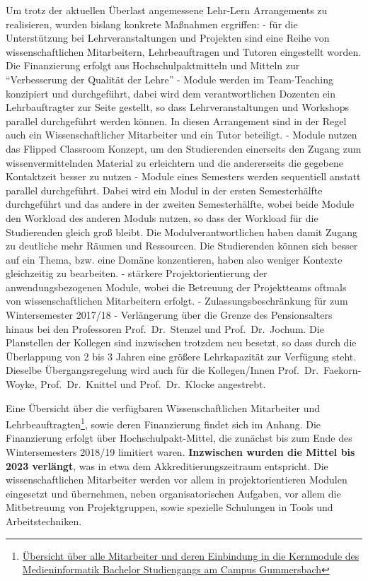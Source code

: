 Um trotz der aktuellen Überlast angemessene Lehr-Lern Arrangements zu
realisieren, wurden bislang konkrete Maßnahmen ergriffen: - für die
Unterstützung bei Lehrveranstaltungen und Projekten sind eine Reihe von
wissenschaftlichen Mitarbeitern, Lehrbeauftragen und Tutoren eingestellt
worden. Die Finanzierung erfolgt aus Hochschulpaktmitteln und Mitteln
zur ``Verbesserung der Qualität der Lehre'' - Module werden im
Team-Teaching konzipiert und durchgeführt, dabei wird dem
verantwortlichen Dozenten ein Lehrbauftragter zur Seite gestellt, so
dass Lehrveranstaltungen und Workshops parallel durchgeführt werden
können. In diesen Arrangement sind in der Regel auch ein
Wissenschaftlicher Mitarbeiter und ein Tutor beteiligt. - Module nutzen
das Flipped Classroom Konzept, um den Studierenden einerseits den Zugang
zum wissenvermittelnden Material zu erleichtern und die andererseits die
gegebene Kontaktzeit besser zu nutzen - Module eines Semesters werden
sequentiell anstatt parallel durchgeführt. Dabei wird ein Modul in der
ersten Semesterhälfte durchgeführt und das andere in der zweiten
Semesterhälfte, wobei beide Module den Workload des anderen Moduls
nutzen, so dass der Workload für die Studierenden gleich groß bleibt.
Die Modulverantwortlichen haben damit Zugang zu deutliche mehr Räumen
und Ressourcen. Die Studierenden können sich besser auf ein Thema, bzw.
eine Domäne konzentieren, haben also weniger Kontexte gleichzeitig zu
bearbeiten. - stärkere Projektorientierung der anwendungsbezogenen
Module, wobei die Betreuung der Projektteams oftmals von
wissenschaftlichen Mitarbeitern erfolgt. - Zulassungsbeschränkung für
zum Wintersemester 2017/18 - Verlängerung über die Grenze des
Pensionsalters hinaus bei den Professoren Prof.~Dr.~Stenzel und
Prof.~Dr.~Jochum. Die Planstellen der Kollegen sind inzwischen trotzdem
neu besetzt, so dass durch die Überlappung von 2 bis 3 Jahren eine
größere Lehrkapazität zur Verfügung steht. Dieselbe Übergangsregelung
wird auch für die Kollegen/Innen Prof.~Dr.~Faekorn-Woyke,
Prof.~Dr.~Knittel und Prof.~Dr.~Klocke angestrebt.

Eine Übersicht über die verfügbaren Wissenschaftlichen Mitarbeiter und
Lehrbeauftragten\footnote{\href{https://th-koeln.github.io/mi-2017/anhaenge/stellungsnahme/mitarbeiter-und-module-mi-kern-2017.pdf}{Übersicht
  über alle Mitarbeiter und deren Einbindung in die Kernmodule des
  Medieninformatik Bachelor Studiengangs am Campus Gummersbach}}, sowie
deren Finanzierung findet sich im Anhang. Die Finanzierung erfolgt über
Hochschulpakt-Mittel, die zunächst bis zum Ende des Wintersemesters
2018/19 limitiert waren. \textbf{Inzwischen wurden die Mittel bis 2023
verlängt}, was in etwa dem Akkreditierungszeitraum entspricht. Die
wissenschaftlichen Mitarbeiter werden vor allem in projektorientieren
Modulen eingesetzt und übernehmen, neben organisatorischen Aufgaben, vor
allem die Mitbetreuung von Projektgruppen, sowie spezielle Schulungen in
Tools und Arbeitstechniken.

